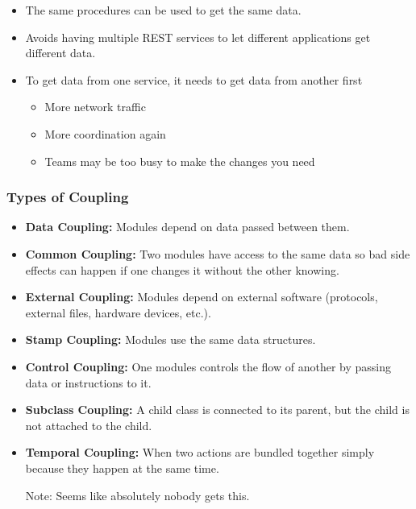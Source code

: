 \begin{itemize}
    \item The same procedures can be used to get the same data.
    \item Avoids having multiple REST services to let different applications get different data.
    \item To get data from one service, it needs to get data from another first
        \begin{itemize}
            \item More network traffic
            \item More coordination again
            \item Teams may be too busy to make the changes you need
        \end{itemize}
\end{itemize}

\subsubsection{Types of Coupling}\label{ssub:types_of_coupling}

\begin{itemize}
    \item \textbf{Data Coupling:} Modules depend on data passed between them.
    \item \textbf{Common Coupling:} Two modules have access to the same data so bad side effects can happen if one changes it without the other knowing.
    \item \textbf{External Coupling:} Modules depend on external software (protocols, external files, hardware devices, etc.).
    \item \textbf{Stamp Coupling:} Modules use the same data structures.
    \item \textbf{Control Coupling:} One modules controls the flow of another by passing data or instructions to it.
    \item \textbf{Subclass Coupling:} A child class is connected to its parent, but the child is not attached to the child.
    \item \textbf{Temporal Coupling:} When two actions are bundled together simply because they happen at the same time.
\end{itemize}

\begin{note}
    \begin{itemize}
        \item[Note:] Seems like absolutely nobody gets this.
    \end{itemize}
\end{note}

